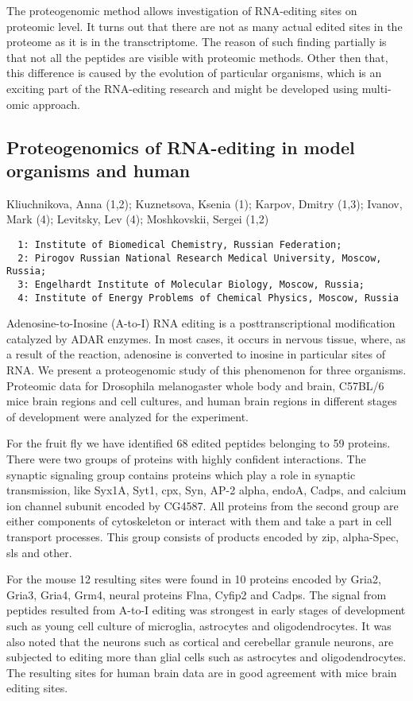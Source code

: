 {The proteogenomic method allows investigation of RNA-editing sites on proteomic level. It turns out that there are not as many actual edited sites in the proteome as it is in the transctriptome. The reason of such finding partially is that not all the peptides are visible with proteomic methods. Other then that, this difference is caused by the evolution of particular organisms, which is an exciting part of the RNA-editing research and might be developed using multi-omic approach.


\subsection*{\color{eubicRed} Proteogenomics of RNA-editing in model organisms and human}
{\color{eubicGray}Kliuchnikova, Anna (1,2);
Kuznetsova, Ksenia (1);
Karpov, Dmitry (1,3);
Ivanov, Mark (4);
Levitsky, Lev (4);
Moshkovskii, Sergei (1,2)}
{\color{eubicGray}\begin{verbatim}
  1: Institute of Biomedical Chemistry, Russian Federation;
  2: Pirogov Russian National Research Medical University, Moscow, Russia;
  3: Engelhardt Institute of Molecular Biology, Moscow, Russia;
  4: Institute of Energy Problems of Chemical Physics, Moscow, Russia
\end{verbatim}}

Adenosine-to-Inosine (A-to-I) RNA editing is a posttranscriptional modification catalyzed by ADAR enzymes. In most cases, it occurs in nervous tissue, where, as a result of the reaction, adenosine is converted to inosine in particular sites of RNA. We present a proteogenomic study of this phenomenon for three organisms. Proteomic data for Drosophila melanogaster whole body and brain, C57BL/6 mice brain regions and cell cultures, and human brain regions in different stages of development were analyzed for the experiment.

For the fruit fly we have identified 68 edited peptides belonging to 59 proteins. There were two groups of proteins with highly confident interactions. The synaptic signaling group contains proteins which play a role in synaptic transmission, like Syx1A, Syt1, cpx, Syn, AP-2 alpha, endoA, Cadps, and calcium ion channel subunit encoded by CG4587. All proteins from the second group are either components of cytoskeleton or interact with them and take a part in cell transport processes. This group consists of products encoded by zip, alpha-Spec, sls and other.

For the mouse 12 resulting sites were found in 10 proteins encoded by Gria2, Gria3, Gria4, Grm4, neural proteins Flna, Cyfip2 and Cadps. The signal from peptides resulted from A-to-I editing was strongest in early stages of development such as young cell culture of microglia, astrocytes and oligodendrocytes. It was also noted that the neurons such as cortical and cerebellar granule neurons, are subjected to editing more than glial cells such as astrocytes and oligodendrocytes. The resulting sites for human brain data are in good agreement with mice brain editing sites.

}
